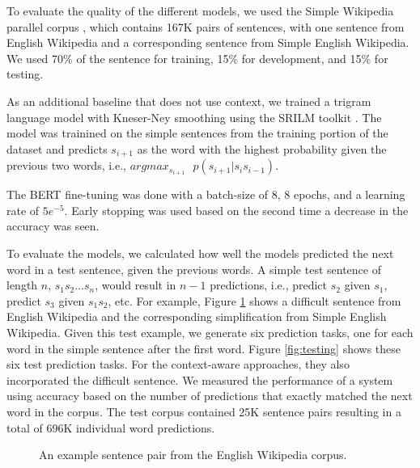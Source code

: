 \documentclass[11pt,a4paper]{article}
\begin{document}
To evaluate the quality of the different models, we used the Simple Wikipedia parallel corpus \cite{kauchak2013improving}, which contains 167K pairs of sentences, with one sentence from English Wikipedia and a corresponding sentence from Simple English Wikipedia.  We used 70\% of the sentence for training, 15\% for development, and 15\% for testing.

As an additional baseline that does not use context, we trained a trigram language model with Kneser-Ney smoothing using the SRILM toolkit \cite{stolcke2002srilm}.  The model was trainined on the simple sentences from the training portion of the dataset and predicts $s_{i+1}$ as the word with the highest probability given the previous two words, i.e., $argmax_{s_{i+1}}\mbox{ } p(s_{i+1}| s_i s_{i-1})$.

The BERT fine-tuning was done with a
batch-size of 8, 8 epochs, and a learning rate of $5e^{-5}$. Early stopping was used based on the second time a decrease in the accuracy was seen.

To evaluate the models, we calculated how well the models predicted the next word in a test sentence, given the previous words.  A simple test sentence of length $n$, $s_1 s_2 ... s_n$, would result in $n-1$ predictions, i.e., predict $s_2$ given $s_1$, predict $s_3$ given $s_1 s_2$, etc.  For example, Figure \ref{fig:testexample} shows a difficult sentence from English Wikipedia and the corresponding simplification from Simple English Wikipedia.  Given this test example, we generate six prediction tasks, one for each word in the simple sentence after the first word.  Figure \ref{fig:testing} shows these six test prediction tasks.  For the context-aware approaches, they also incorporated the difficult sentence. We measured the performance of a system using accuracy based on the number of predictions that exactly matched the next word in the corpus.  The test corpus contained 25K sentence pairs resulting in a total of 696K individual word predictions.

\begin{figure}
    \centering
    \caption{An example sentence pair from the English Wikipedia corpus.}
    \label{fig:testexample}
\end{figure}
\end{document}
